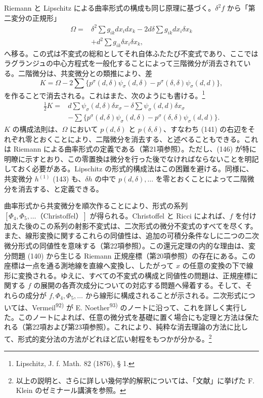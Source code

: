 \documentclass[11pt]{article}
\begin{document}
Riemann と Lipschitz による曲率形式の構成も同じ原理に基づく。$\delta^2f$ から「第二変分の正規形」
\begin{equation}
\begin{aligned}
\Omega={}&\delta^2\sum g_{ik}dx_i dx_k
-2d\delta\sum g_{ik}dx_i\delta x_k\\
&+d^2\sum g_{ik}\delta x_i\delta x_k,
\end{aligned}
\tag{144}
\end{equation}
へ移る。この式は不変式の総和としてそれ自体ふたたび不変式であり、ここではラグランジ\nolinebreak[4]ュの中心方程式を一般化することによって三階微分が消去されている。二階微分は、共変微分との類推により、差
\begin{equation}
K=\Omega-2\sum\{p^\sigma(d,\delta)\psi_\sigma(d,\delta)
-p^\sigma(\delta,\delta)\psi_\sigma(d,d)\},
\tag{145}
\end{equation}
を作ることで消去される。これはまた、次のようにも書ける。\footnote{Lipschitz, J. f. Math. 82 (1876), § 1.}
\begin{equation}
\begin{aligned}
\frac12 K={}&d\sum\psi_\sigma(d,\delta)\delta x_\sigma
-\delta\sum\psi_\sigma(d,d)\delta x_\sigma\\
&-\sum\{p^\sigma(d,\delta)\psi_\sigma(d,\delta)
-p^\sigma(\delta,\delta)\psi_\sigma(d,d)\}.
\end{aligned}
\tag{146}
\end{equation}
$K$ の構成法則は、$\Omega$ において $p(d,\delta)$ と $p(\delta,\delta)$、すなわち (141) の右辺をそれぞれ零とおくことにより、二階微分を消去する、と述べることもできる。これは Riemann による曲率形式の定義である（第21項参照）。ただし、(146) が特に明瞭に示すとおり、この零置換は微分を行った後でなければならないことを明記しておく必要がある。Lipschitz の形式的構成法はこの困難を避ける。同様に、共変微分 $h^{(1)}$ (143) も、$\delta h$ の中で $p(d,\delta),\ldots$ を零とおくことによって二階微分を消去する、と定義できる。

曲率形式から共変微分を順次作ることにより、形式の系列 $[\Phi_4,\Phi_5,\ldots\text{（Christoffel）}]$ が得られる。Christoffel と Ricci によれば、$f$ を付け加えた後のこの系列の射影不変式は、二次形式の微分不変式のすべてを尽くす。また、線形変換に関するこれらの同値性は、追加の可積分条件なしに二つの二次微分形式の同値性を意味する（第22項参照）。この還元定理の内的な理由は、変分問題 (140) から生じる Riemann 正規座標（第20項参照）の存在にある。この座標は一点を通る測地線を直線へ変換し、したがって $x$ の任意の変換の下で線形に変換される。ゆえに、すべての不変式の構成と同値性の問題は、正規座標に関する $f$ の展開の各斉次成分についての対応する問題へ帰着する。そして、それらの成分が $f,\Phi_4,\Phi_5,\ldots$ から線形に構成されることが示される。二次形式については、Vermeil\textsuperscript{92)} が E. Noether\textsuperscript{93)} のノートに沿\nolinebreak[4]って、これを詳しく実行した。このノートによれば、任意の微分式を基礎に置く場合にも定理と方法は保たれる（第22項および第23項参照）。これにより、純粋な消去理論の方法に比して、形式的変分法の方法がどれほど広い射程をもつかが分かる。\footnote{以上の説明と、さらに詳しい幾何学的解釈については、「文献」に挙げた F. Klein のゼミナール講演を参照。}
\end{document}
